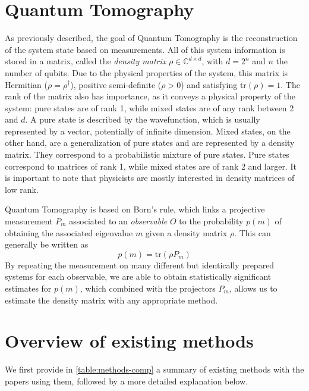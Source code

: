 \documentclass[12pt]{memoir}
\newcommand{\tr}{\text{tr}}
\begin{document}
\section{Quantum Tomography} \label{introduction:quantum-tomography}

As previously described, the goal of Quantum Tomography is the reconstruction of the system state based on measurements. All of this system information is stored in a matrix, called the \textit{density matrix} $\rho \in \mathbb{C}^{d \times d}$, with $d = 2^n$ and $n$ the number of qubits. Due to the physical properties of the system, this matrix is Hermitian ($\rho = \rho^{\dagger}$), positive semi-definite ($\rho > 0$) and satisfying $\tr(\rho) = 1$. The rank of the matrix also has importance, as it conveys a physical property of the system: pure states are of rank 1, while mixed states are of any rank between 2 and $d$. A pure state is described by the wavefunction, which is usually represented by a vector, potentially of infinite dimension. Mixed states, on the other hand, are a generalization of pure states and are represented by a density matrix. They correspond to a probabilistic mixture of pure states. Pure states correspond to matrices of rank 1, while mixed states are of rank 2 and larger. It is important to note that physicists are mostly interested in density matrices of low rank.\medbreak

Quantum Tomography is based on Born's rule, which links a projective measurement $P_m$ associated to an \textit{observable} $O$ to the probability $p(m)$ of obtaining the associated eigenvalue $m$ given a density matrix $\rho$. This can generally be written as 
\begin{equation}
    p(m) = \tr(\rho P_m)
\end{equation}
By repeating the measurement on many different but identically prepared systems for each observable, we are able to obtain statistically significant estimates for $p(m)$, which combined with the projectors $P_m$, allows us to estimate the density matrix with any appropriate method.
\section{Overview of existing methods}\label{section:litterature-review}
We first provide in \ref{table:methods-comp} a summary of existing methods with the papers using them, followed by a more detailed explanation below.  
\end{document}
